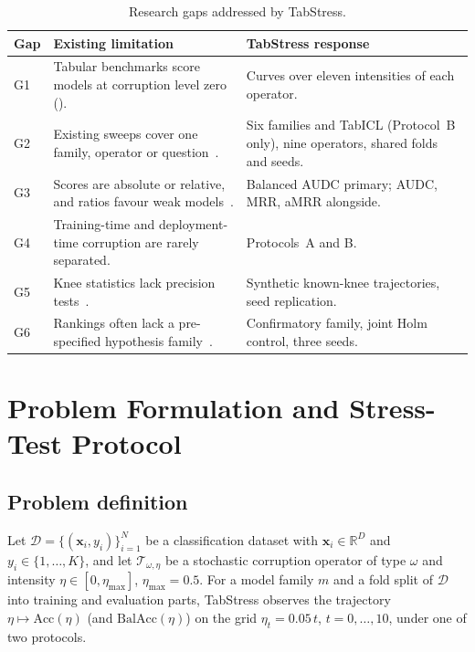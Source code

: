 \documentclass[pdflatex,sn-mathphys]{sn-jnl}
\theoremstyle{thmstyleone}
\theoremstyle{thmstyletwo}
\theoremstyle{thmstylethree}
\newcommand{\Acc}{\mathrm{Acc}}
\newcommand{\BalAcc}{\mathrm{BalAcc}}
\newcommand{\etamax}{\eta_{\max}}
\begin{document}
\begin{table}[t]
\centering
\footnotesize
\caption{Research gaps addressed by TabStress.}\label{tab:gaps}
\begin{tabular}{@{}p{0.6cm}p{4.8cm}p{5.4cm}@{}}
\toprule
Gap & Existing limitation & TabStress response \\
\midrule
G1 & Tabular benchmarks score models at corruption level zero (\cite{grinsztajn2022tree}). & Curves over eleven intensities of each operator. \\
G2 & Existing sweeps cover one family, operator or question~\cite{zhu2004class,mohammed2025effects}. & Six families and TabICL (Protocol~B only), nine operators, shared folds and seeds. \\
G3 & Scores are absolute or relative, and ratios favour weak models~\cite{hendrycks2019benchmarking,saez2015evaluating}. & Balanced AUDC primary; AUDC, MRR, aMRR alongside. \\
G4 & Training-time and deployment-time corruption are rarely separated. & Protocols~A and B. \\
G5 & Knee statistics lack precision tests~\cite{satopaa2011finding}. & Synthetic known-knee trajectories, seed replication. \\
G6 & Rankings often lack a pre-specified hypothesis family~\cite{demsar2006statistical}. & Confirmatory family, joint Holm control, three seeds. \\
\bottomrule
\end{tabular}
\end{table}

\section{Problem Formulation and Stress-Test Protocol}\label{sec:problem}

\subsection{Problem definition}\label{sec:problem:def}

Let $\mathcal{D}=\{(\mathbf{x}_i,y_i)\}_{i=1}^{N}$ be a classification dataset with $\mathbf{x}_i\in\mathbb{R}^{D}$ and $y_i\in\{1,\dots,K\}$, and let $\mathcal{T}_{\omega,\eta}$ be a stochastic corruption operator of type $\omega$ and intensity $\eta\in[0,\etamax]$, $\etamax=0.5$. For a model family $m$ and a fold split of $\mathcal{D}$ into training and evaluation parts, TabStress observes the trajectory $\eta\mapsto\Acc(\eta)$ (and $\BalAcc(\eta)$) on the grid $\eta_t=0.05\,t$, $t=0,\dots,10$, under one of two protocols.
\end{document}
